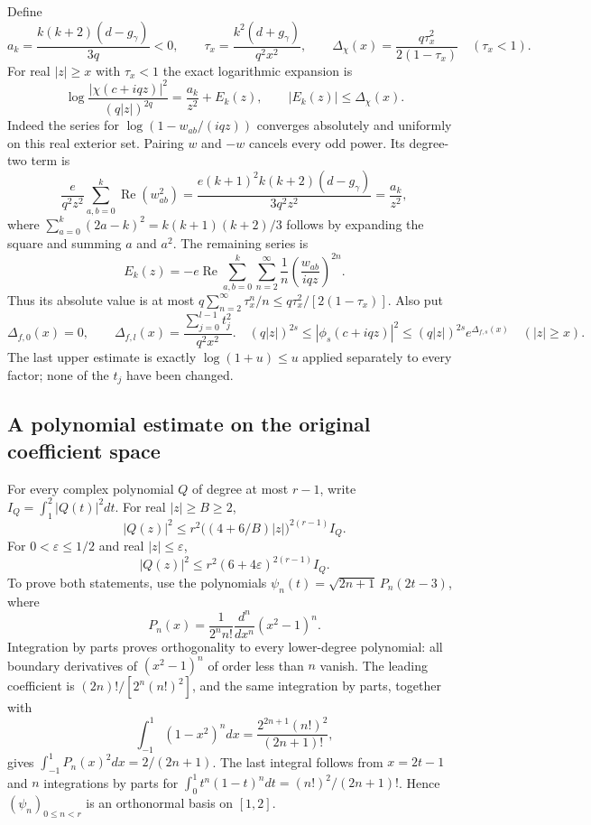 \documentclass[11pt,a4paper]{article}
\begin{document}
Define
\begin{equation}
 a_k=\frac{k(k+2)(d-g_\gamma)}{3q}<0,\qquad
 \tau_x=\frac{k^2(d+g_\gamma)}{q^2x^2},\qquad
 \Delta_\chi(x)=\frac{q\tau_x^2}{2(1-\tau_x)}
 \quad(\tau_x<1).
 \tag{FTC6}
\end{equation}
For real $|z|\ge x$ with $\tau_x<1$ the exact logarithmic expansion is
\begin{equation}
 \log\frac{|\chi(c+iqz)|^2}{(q|z|)^{2q}}
 =\frac{a_k}{z^2}+E_k(z),\qquad |E_k(z)|\le\Delta_\chi(x).
 \tag{FTC7}
\end{equation}
Indeed the series for $\log(1-w_{ab}/(iqz))$ converges absolutely and
uniformly on this real exterior set.  Pairing $w$ and $-w$ cancels every
odd power.  Its degree-two term is
\[
 \frac{e}{q^2z^2}\sum_{a,b=0}^k\operatorname{Re}(w_{ab}^2)
 =\frac{e(k+1)^2k(k+2)(d-g_\gamma)}{3q^2z^2}
 =\frac{a_k}{z^2},
\]
where $\sum_{a=0}^k(2a-k)^2=k(k+1)(k+2)/3$ follows by expanding the
square and summing $a$ and $a^2$.  The remaining series is
\[
 E_k(z)=-e\operatorname{Re}
 \sum_{a,b=0}^k\sum_{n=2}^\infty
 \frac1n\left(\frac{w_{ab}}{iqz}\right)^{2n}.
\]
Thus its absolute value is at most
$q\sum_{n=2}^\infty\tau_x^n/n\le q\tau_x^2/[2(1-\tau_x)]$.
Also put
\begin{equation}
 \Delta_{f,0}(x)=0,\qquad
 \Delta_{f,l}(x)=\frac{\sum_{j=0}^{l-1}t_j^2}{q^2x^2}.
 \quad
 (q|z|)^{2s}\le|\phi_s(c+iqz)|^2
 \le(q|z|)^{2s}e^{\Delta_{f,s}(x)}\quad(|z|\ge x).
 \tag{FTC8}
\end{equation}
The last upper estimate is exactly $\log(1+u)\le u$ applied separately
to every factor; none of the $t_j$ have been changed.

\subsection{A polynomial estimate on the original coefficient space}

For every complex polynomial $Q$ of degree at most $r-1$, write
$I_Q=\int_1^2|Q(t)|^2dt$.  For real $|z|\ge B\ge2$,
\begin{equation}
 |Q(z)|^2\le r^2\bigl((4+6/B)|z|\bigr)^{2(r-1)}I_Q.
 \tag{FTC9}
\end{equation}
For $0<\varepsilon\le1/2$ and real $|z|\le\varepsilon$,
\begin{equation}
 |Q(z)|^2\le r^2(6+4\varepsilon)^{2(r-1)}I_Q.
 \tag{FTC10}
\end{equation}
To prove both statements, use the polynomials
$\psi_n(t)=\sqrt{2n+1}\,P_n(2t-3)$, where
\[
 P_n(x)=\frac{1}{2^n n!}\frac{d^n}{dx^n}(x^2-1)^n.
\]
Integration by parts proves orthogonality to every lower-degree polynomial:
all boundary derivatives of $(x^2-1)^n$ of order less than $n$ vanish.
The leading coefficient is $(2n)!/[2^n(n!)^2]$, and the same integration
by parts, together with
\[
 \int_{-1}^1(1-x^2)^n dx
 =\frac{2^{2n+1}(n!)^2}{(2n+1)!},
\]
gives $\int_{-1}^1P_n(x)^2dx=2/(2n+1)$.  The last integral follows from
$x=2t-1$ and $n$ integrations by parts for
$\int_0^1t^n(1-t)^n dt=(n!)^2/(2n+1)!$.
Hence $(\psi_n)_{0\le n<r}$ is an orthonormal basis on $[1,2]$.
\end{document}

